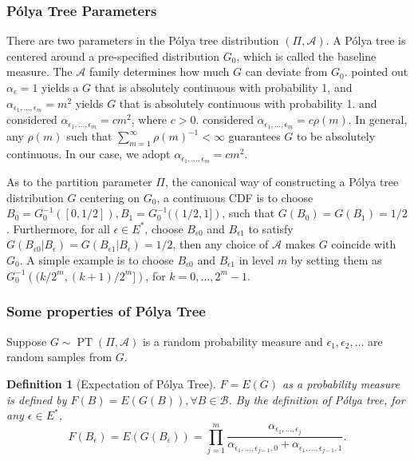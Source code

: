 \documentclass[12pt]{article}
\newtheorem{deff}[thm]{Definition}
\newcommand{\polya}{P\'{o}lya}
\DeclareMathOperator{\pt}{PT}
\begin{document}
\subsubsection{\polya{} Tree Parameters}
There are two parameters in the \polya{} tree distribution $(\Pi,
\mathcal{A})$. A \polya{} tree is centered around a
  pre-specified distribution $G_0$, which is called the baseline
  measure. The $\mathcal{A}$ family determines how much $G$ can
deviate from $G_0$. \citet{ferguson1974} pointed out $\alpha_{\epsilon} = 1
$ yields a $G$ that is absolutely continuous with probability 1, and
$\alpha_{\epsilon_1, \ldots, \epsilon_m} = m^2$ yields $G$ that is
absolutely continuous with probability 1. \citet{walker1999} and
\citet{paddock1999} considered $\alpha_{\epsilon_1, \ldots,
  \epsilon_m} = cm^2$, where $c > 0$. \citet{berger2001} considered
$\alpha_{\epsilon_1, \ldots, \epsilon_m} = c \rho(m)$. In general, any
$\rho(m) $ such that $\sum_{m=1}^{\infty} \rho(m)^{-1} < \infty$
guarantees $G$ to be absolutely continuous. In our case, we adopt
$\alpha_{\epsilon_1, \ldots, \epsilon_m} = cm^2$.

As to the partition parameter $\Pi$, the canonical way of constructing
a \polya{} tree distribution $G$ centering on $G_0$, a continuous CDF
is to choose $B_0 = G^{-1}_0 ([0, 1/2]), B_1 = G^{-1}_0 ((1/2,1])$,
such that $G(B_0) = G(B_1)= 1/2$. Furthermore, for all $\epsilon \in
E^{*}$, choose $B_{\epsilon 0 }$ and $B_{\epsilon 1}$ to satisfy
$G(B_{\epsilon 0 } |B_{\epsilon} ) = G(B_{\epsilon 1} | B_{\epsilon})
= 1/2 $, then any choice of $\mathcal{A} $ makes $G$ coincide with
$G_0$. A simple example is to choose $B_{\epsilon 0} $ and
$B_{\epsilon 1}$ in level $m$ by setting them as $G^{-1}_0 \left(
  (k/2^m, (k+1)/2^m] \right)$, for $k=0, \ldots, 2^m-1$.

\subsubsection{Some properties of \polya{} Tree}
Suppose $G \sim \pt (\Pi, \mathcal{A})$ is a random probability
measure and $\epsilon_1, \epsilon_2, \ldots$ are random samples from
$G$.

\begin{deff}[Expectation of \polya{} Tree]
  $F= E(G)$ as a probability measure is defined by $F(B) = E(G(B)),
  \forall B \in \mathcal{B}$. By the definition of \polya{} tree, for
  any $\epsilon \in E^{*}$,
  \begin{displaymath}
    F(B_{\epsilon})  = E(G(B_{\epsilon})) = \prod_{j=1}^m
    \frac{\alpha_{\epsilon_1, \ldots, \epsilon_j}}{\alpha_{\epsilon_1,
        \ldots, \epsilon_{j-1},0} + \alpha_{\epsilon_1, \ldots, \epsilon_{j-1},1}}.
  \end{displaymath}
\end{deff}
\end{document}
